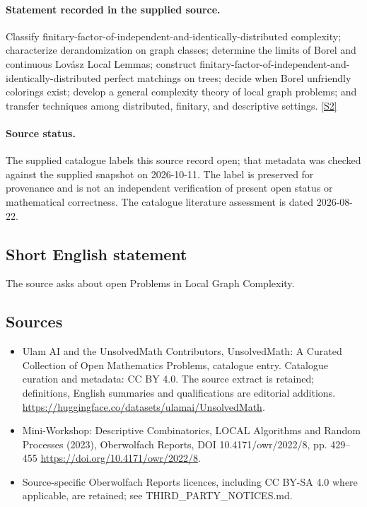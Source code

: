 \documentclass[11pt]{article}
\begin{document}
\paragraph{Statement recorded in the supplied source.}
Classify finitary-factor-of-independent-and-identically-distributed complexity; characterize derandomization on graph classes; determine the limits of Borel and continuous Lovász Local Lemmas; construct finitary-factor-of-independent-and-identically-distributed perfect matchings on trees; decide when Borel unfriendly colorings exist; develop a general complexity theory of local graph problems; and transfer techniques among distributed, finitary, and descriptive settings. \href{https://doi.org/10.4171/owr/2022/8}{[S2]}
\paragraph{Source status.}
The supplied catalogue labels this source record open; that metadata was checked against the supplied snapshot on 2026-10-11. The label is preserved for provenance and is not an independent verification of present open status or mathematical correctness. The catalogue literature assessment is dated 2026-08-22.
\subsection{Short English statement}
The source asks about open Problems in Local Graph Complexity.
\subsection{Sources}
\begin{itemize}
\item[S1] Ulam AI and the UnsolvedMath Contributors, UnsolvedMath: A Curated Collection of Open Mathematics Problems, catalogue entry. Catalogue curation and metadata: CC BY 4.0. The source extract is retained; definitions, English summaries and qualifications are editorial additions.
\url{https://huggingface.co/datasets/ulamai/UnsolvedMath}.
\item[S2] Mini-Workshop: Descriptive Combinatorics, LOCAL Algorithms and Random Processes (2023), Oberwolfach Reports, DOI 10.4171/owr/2022/8, pp. 429--455
\url{https://doi.org/10.4171/owr/2022/8}.
\item Source-specific Oberwolfach Reports licences, including CC BY-SA 4.0 where applicable, are retained; see THIRD\_PARTY\_NOTICES.md.
\end{itemize}
\end{document}
